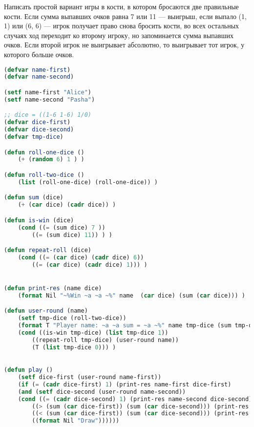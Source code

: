 \documentclass[a4paper,oneside,12pt]{extreport}
\begin{document}
\begin{task}
    Написать простой вариант игры в кости, в котором бросаются две правильные кости.
    Если сумма выпавших очков равна 7 или 11 — выигрыш, если выпало (1, 1) или (6, 6) — игрок получает право снова бросить кости, во всех остальных случаях ход переходит ко второму игроку, но запоминается сумма выпавших очков.
    Если второй игрок не выигрывает абсолютно, то выигрывает тот игрок, у которого больше очков.

    \begin{lstlisting}[language=Lisp]
(defvar name-first)
(defvar name-second)

(setf name-first "Alice")
(setf name-second "Pasha")

;; dice = ((1-6 1-6) 1/0)
(defvar dice-first)
(defvar dice-second)
(defvar tmp-dice)

(defun roll-one-dice ()
    (+ (random 6) 1 ) )

(defun roll-two-dice ()
    (list (roll-one-dice) (roll-one-dice)) )

(defun sum (dice) 
    (+ (car dice) (cadr dice)) )

(defun is-win (dice) 
    (cond ((= (sum dice) 7 )) 
        ((= (sum dice) 11)) ) )

(defun repeat-roll (dice)
    (cond ((= (car dice) (cadr dice) 6))
        ((= (car dice) (cadr dice) 1))) )


(defun print-res (name dice) 
    (format Nil "~%Win ~a ~a ~%" name  (car dice) (sum (car dice))) )

(defun user-round (name)
    (setf tmp-dice (roll-two-dice))
    (format T "Player name: ~a ~a sum = ~a ~%" name tmp-dice (sum tmp-dice))
    (cond ((is-win tmp-dice) (list tmp-dice 1))
        ((repeat-roll tmp-dice) (user-round name))
        (T (list tmp-dice 0))) )
        

(defun play ()
    (setf dice-first (user-round name-first))
    (if (= (cadr dice-first) 1) (print-res name-first dice-first)
    (and (setf dice-second (user-round name-second))
    (cond ((= (cadr dice-second) 1) (print-res name-second dice-second))
        ((> (sum (car dice-first)) (sum (car dice-second))) (print-res name-first dice-first))
        ((< (sum (car dice-first)) (sum (car dice-second))) (print-res name-second dice-second))
        ((format Nil "Draw"))))))
    \end{lstlisting}
    


\end{task}
\end{document}
